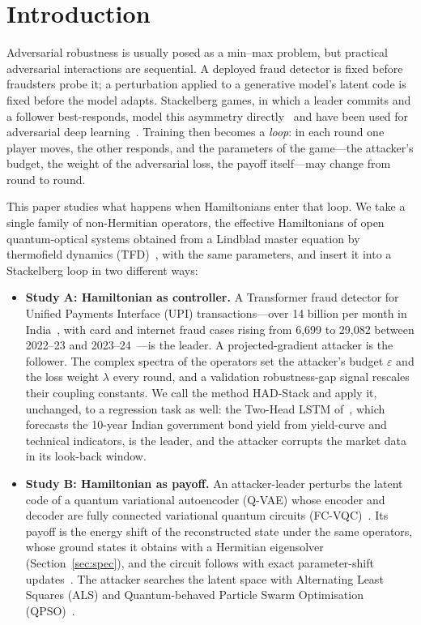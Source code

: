 \documentclass[conference]{IEEEtran}
\begin{document}
\section{Introduction}
Adversarial robustness is usually posed as a min--max problem, but practical adversarial interactions are sequential. A deployed fraud detector is fixed before fraudsters probe it; a perturbation applied to a generative model's latent code is fixed before the model adapts. Stackelberg games, in which a leader commits and a follower best-responds, model this asymmetry directly~\cite{stackelberg1934,basar1999,bruckner2011,tambe2011} and have been used for adversarial deep learning~\cite{chivukula2017,chivukula2019,chivukula2021}. Training then becomes a \emph{loop}: in each round one player moves, the other responds, and the parameters of the game---the attacker's budget, the weight of the adversarial loss, the payoff itself---may change from round to round.

This paper studies what happens when Hamiltonians enter that loop. We take a single family of non-Hermitian operators, the effective Hamiltonians of open quantum-optical systems obtained from a Lindblad master equation by thermofield dynamics (TFD)~\cite{lindblad1976,takahashi1975,patel2026,patel2025}, with the same parameters, and insert it into a Stackelberg loop in two different ways:
\begin{itemize}
\item \textbf{Study A: Hamiltonian as controller.} A Transformer fraud detector for Unified Payments Interface (UPI) transactions---over 14 billion per month in India~\cite{npci2024}, with card and internet fraud cases rising from 6,699 to 29,082 between 2022--23 and 2023--24~\cite{rbi2024}---is the leader. A projected-gradient attacker is the follower. The complex spectra of the operators set the attacker's budget $\varepsilon$ and the loss weight $\lambda$ every round, and a validation robustness-gap signal rescales their coupling constants. We call the method HAD-Stack and apply it, unchanged, to a regression task as well: the Two-Head LSTM of~\cite{pilaka2026bond}, which forecasts the 10-year Indian government bond yield from yield-curve and technical indicators, is the leader, and the attacker corrupts the market data in its look-back window.
\item \textbf{Study B: Hamiltonian as payoff.} An attacker-leader perturbs the latent code of a quantum variational autoencoder (Q-VAE) whose encoder and decoder are fully connected variational quantum circuits (FC-VQC)~\cite{su2026}. Its payoff is the energy shift of the reconstructed state under the same operators, whose ground states it obtains with a Hermitian eigensolver (Section~\ref{sec:spec}), and the circuit follows with exact parameter-shift updates~\cite{mitarai2018,schuld2019}. The attacker searches the latent space with Alternating Least Squares (ALS) and Quantum-behaved Particle Swarm Optimisation (QPSO)~\cite{sun2004}.
\end{itemize}
\end{document}
